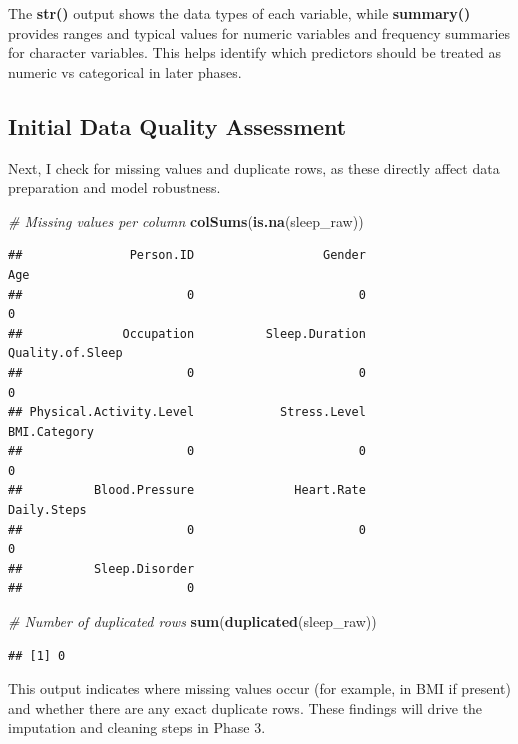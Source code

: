 \documentclass[
]{article}
\newenvironment{Shaded}{\begin{snugshade}}{\end{snugshade}}
\newcommand{\CommentTok}[1]{\textcolor[rgb]{0.56,0.35,0.01}{\textit{#1}}}
\newcommand{\FunctionTok}[1]{\textcolor[rgb]{0.13,0.29,0.53}{\textbf{#1}}}
\newcommand{\NormalTok}[1]{#1}
\begin{document}
The \textbf{str()} output shows the data types of each variable, while
\textbf{summary()} provides ranges and typical values for numeric
variables and frequency summaries for character variables. This helps
identify which predictors should be treated as numeric vs categorical in
later phases.

\subsection{Initial Data Quality
Assessment}\label{initial-data-quality-assessment}

Next, I check for missing values and duplicate rows, as these directly
affect data preparation and model robustness.

\begin{Shaded}
\begin{Highlighting}[]
\CommentTok{\# Missing values per column}
\FunctionTok{colSums}\NormalTok{(}\FunctionTok{is.na}\NormalTok{(sleep\_raw))}
\end{Highlighting}
\end{Shaded}

\begin{verbatim}
##               Person.ID                  Gender                     Age 
##                       0                       0                       0 
##              Occupation          Sleep.Duration        Quality.of.Sleep 
##                       0                       0                       0 
## Physical.Activity.Level            Stress.Level            BMI.Category 
##                       0                       0                       0 
##          Blood.Pressure              Heart.Rate             Daily.Steps 
##                       0                       0                       0 
##          Sleep.Disorder 
##                       0
\end{verbatim}

\begin{Shaded}
\begin{Highlighting}[]
\CommentTok{\# Number of duplicated rows}
\FunctionTok{sum}\NormalTok{(}\FunctionTok{duplicated}\NormalTok{(sleep\_raw))}
\end{Highlighting}
\end{Shaded}

\begin{verbatim}
## [1] 0
\end{verbatim}

This output indicates where missing values occur (for example, in BMI if
present) and whether there are any exact duplicate rows. These findings
will drive the imputation and cleaning steps in Phase 3.
\end{document}
